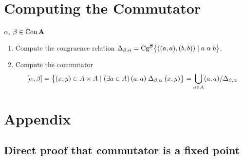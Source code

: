 \section{Computing the Commutator}

 $\alpha$, $\beta \in \operatorname{Con} \mathbf{A}$

\bigskip

\begin{enumerate}[Step 1.]
\item Compute the congruence relation
  $\Deltaba = \Cg^{\bbeta}\bigl\{((a,a), (b,b)) \mid a \alphar b \bigr\}$.
\item Compute the commutator
  \[[\alpha, \beta] 
  = \bigl\{(x,y) \in A\times A \mid (\exists a \in A) \, (a,a) \mathrel{\Delta_{\beta, \alpha}} (x,y)\bigr\} 
  =\bigcup_{a\in A} (a,a)/\Delta_{\beta, \alpha}
    \]
\end{enumerate}

















\appendix
\section{Appendix}
\subsection{Direct proof that commutator is a fixed point}

